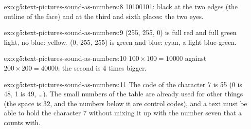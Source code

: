 \begin{solution}{exo:g5:text-pictures-sound-as-numbers:8}
10100101: black  at the two edges (the outline of the face) and at the
third and sixth places: the two eyes.
\end{solution}

\begin{solution}{exo:g5:text-pictures-sound-as-numbers:9}
(255, 255, 0) is full red and full green light, no blue: yellow. (0, 255, 255)
is green and blue: cyan, a light blue-green.
\end{solution}

\begin{solution}{exo:g5:text-pictures-sound-as-numbers:10}
$100 \times 100 = \num{10000}$  against $200 \times 200 = \num{40000}$:
the second  is 4 times bigger.
\end{solution}

\begin{solution}{exo:g5:text-pictures-sound-as-numbers:11}
The code of the character 7 is 55 (0 is 48, 1 is 49, \dots). The small numbers
of the table are already used for other things (the space is 32, and the
numbers below it are control codes), and a text must be able to hold the
character 7 without mixing it up with the number seven that a  counts
with.
\end{solution}
